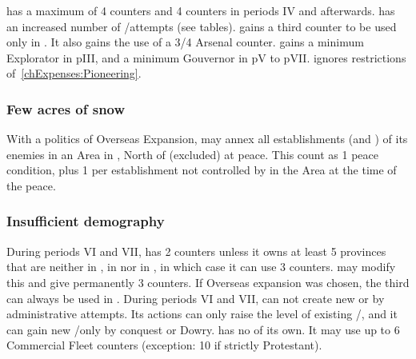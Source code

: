 \bparag \SUE has a maximum of 4 \TP counters and 4 \COL counters in
periods IV and afterwards.
\bparag \SUE has an increased number of \TP/\COL attempts (see tables).
\bparag \SUE gains a third \ARMY counter to be used only in \ROTW.
It also gains the use of a 3/4 Arsenal counter.
\bparag \SUE gains a minimum Explorator in pIII, and a minimum Gouvernor
in pV to pVII.
\bparag \SUE ignores restrictions of~\ref{chExpenses:Pioneering}.

\subsubsection{Few acres of snow}
\aparag With a politics of Overseas Expansion, \SUE may annex all
establishments (\COL and \TP) of its enemies in an Area in
\continentAmerica, North of \granderegionChichimeca (excluded) at peace.
\bparag This count as 1 peace condition, plus 1 per establishment not
controlled by \SUE in the Area at the time of the peace.


\subsubsection{Insufficient demography}
\aparag During periods VI and VII, \SUE has 2 \ARMY counters unless it
owns at least 5 provinces that are neither in , in
 nor in , in which case it can use 3
\ARMY counters. 
\bparag {} may modify this and give \SUE
permanently 3 \ARMY counters.
\bparag If Overseas expansion was chosen, the third \ARMY can always be
used in \ROTW.
\aparag During periods VI and VII, \SUE can not create new \COL or \TP by
administrative attempts. Its actions can only raise the level of
existing \COL/\TP, and it can gain new \TP/\COL only by conquest or
Dowry.
\aparag \SUE has no \CTZ of its own. It may use up to 6 Commercial
Fleet counters (exception: 10 if strictly Protestant).

